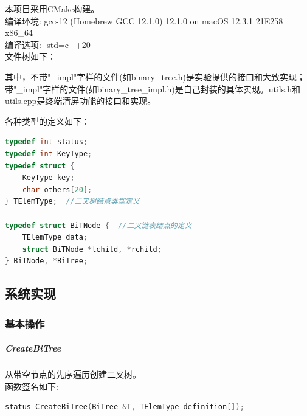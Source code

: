 \documentclass[supercite]{Experimental_Report}
\theoremstyle{definition}
\begin{document}
本项目采用CMake构建。 \\

编译环境: gcc-12 (Homebrew GCC 12.1.0) 12.1.0 on macOS 12.3.1 21E258 x86\_64  \\

编译选项: -std=c++20 \\

文件树如下：

其中，不带"\_impl"字样的文件(如binary\_tree.h)是实验提供的接口和大致实现；带"\_impl"字样的文件(如binary\_tree\_impl.h)是自己封装的具体实现。utils.h和utils.cpp是终端清屏功能的接口和实现。

各种类型的定义如下：
\begin{lstlisting}[language=C++, frame=single]
typedef int status;
typedef int KeyType;
typedef struct {
	KeyType key;
	char others[20];
} TElemType;  //二叉树结点类型定义

typedef struct BiTNode {  //二叉链表结点的定义
	TElemType data;
	struct BiTNode *lchild, *rchild;
} BiTNode, *BiTree;
\end{lstlisting}

\subsection{系统实现}

\subsubsection{基本操作}

\subparagraph{CreateBiTree}
\noindent
从带空节点的先序遍历创建二叉树。\\
函数签名如下:
\begin{lstlisting}[language=C++, frame=single]
status CreateBiTree(BiTree &T, TElemType definition[]);
\end{lstlisting}
\end{document}
